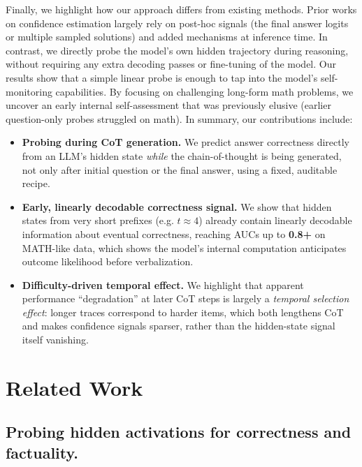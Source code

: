 \documentclass[10pt,a4paper,twocolumn]{article}
\begin{document}
Finally, we highlight how our approach differs from existing methods. Prior works on confidence estimation largely rely on post-hoc signals (the final answer logits or multiple sampled solutions) and added mechanisms at inference time. In contrast, we directly probe the model’s own hidden trajectory during reasoning, without requiring any extra decoding passes or fine-tuning of the model. Our results show that a simple linear probe is enough to tap into the model’s self-monitoring capabilities. By focusing on challenging long-form math problems, we uncover an early internal self-assessment that was previously elusive (earlier question-only probes struggled on math). In summary, our contributions include:

\begin{itemize}[leftmargin=1em,itemsep=2pt,topsep=2pt]
  \item \textbf{Probing during CoT generation.} We predict answer correctness directly from an LLM’s hidden state \emph{while} the chain-of-thought is being generated, not only after initial question or the final answer, using a fixed, auditable recipe.
  \item \textbf{Early, linearly decodable correctness signal.} We show that hidden states from very short prefixes (e.g. $t\!\approx\!4$) already contain linearly decodable information about eventual correctness, reaching AUCs up to \textbf{0.8+} on MATH-like data, which shows the model’s internal computation anticipates outcome likelihood before verbalization.
  \item \textbf{Difficulty-driven temporal effect.} We highlight that apparent performance “degradation” at later CoT steps is largely a \emph{temporal selection effect}: longer traces correspond to harder items, which both lengthens CoT and makes confidence signals sparser, rather than the hidden-state signal itself vanishing.
\end{itemize}



\section{Related Work}
\label{sec:related}

\subsection{Probing hidden activations for correctness and factuality.}
\end{document}
